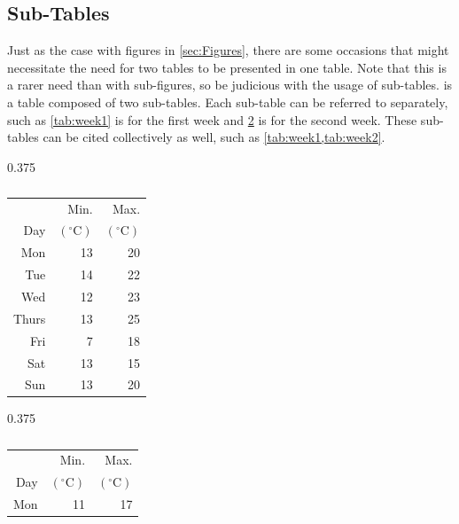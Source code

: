 \subsection{Sub-Tables}
    Just as the case with figures in \cref{sec:Figures}, there are some occasions that might necessitate the need for two tables to be presented in one table.
    Note that this is a rarer need than with sub-figures, so be judicious with the usage of sub-tables.
     is a table composed of two sub-tables.
    Each sub-table can be referred to separately, such as \cref{tab:week1} is for the first week and \cref{tab:week2} is for the second week.
    These sub-tables can be cited collectively as well, such as \cref{tab:week1,tab:week2}.
    \begin{table}
        \begin{subtable}[t]{0.375\textwidth}
            \centering
            \caption{}
            \label{tab:week1}
            \begin{tabular}{r r r}
                      & Min.  & Max. \\
                Day   & $\left(^\circ\text{C}\right)$
                              & $\left(^\circ\text{C}\right)$ \\
                \hline
                Mon   & 13 & 20 \\
                Tue   & 14 & 22 \\
                Wed   & 12 & 23 \\
                Thurs & 13 & 25 \\
                Fri   & 7  & 18 \\
                Sat   & 13 & 15 \\
                Sun   & 13 & 20 \\
                \hline
            \end{tabular}
        \end{subtable}
        \hspace{0.2in}
        \begin{subtable}[t]{0.375\textwidth}
            \caption{}
            \label{tab:week2}
            \centering
            \begin{tabular}{r r r}
                      & Min.  & Max. \\
                Day   & $\left(^\circ\text{C}\right)$
                              & $\left(^\circ\text{C}\right)$ \\
                \hline
                Mon   & 11 & 17 \\

\end{tabular}
\end{subtable}
\end{table}
